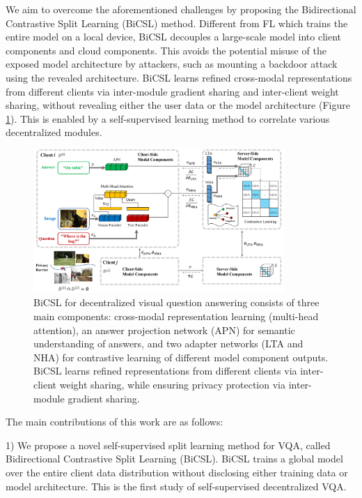 \documentclass[letterpaper]{article} %
\begin{document}
We aim to overcome the aforementioned challenges by proposing the Bidirectional Contrastive Split Learning (BiCSL) method. Different from FL which trains the entire model on a local device, BiCSL decouples a large-scale model into client components and cloud components. This avoids the potential misuse of the exposed model architecture by attackers, such as mounting a backdoor attack using the revealed architecture. BiCSL learns refined cross-modal representations from different clients via inter-module gradient sharing and inter-client weight sharing, without revealing either the user data or the model architecture (Figure \ref{fig:scheme}). This is enabled by a self-supervised learning method to correlate various decentralized modules.


\begin{figure}
    \centering
    \includegraphics[width=0.85\textwidth]{figures/scheme.pdf}
    \caption{BiCSL for decentralized visual question answering consists of three main components: cross-modal representation learning (multi-head attention), an answer projection network (APN) for semantic understanding of answers, and two adapter networks (LTA and NHA) for contrastive learning of different model component outputs. BiCSL learns refined representations from different clients via inter-client weight sharing, while ensuring privacy protection via inter-module gradient sharing.}
    \label{fig:scheme}
\end{figure}

The main contributions of this work are as follows:

1) We propose a novel self-supervised split learning method for VQA, called Bidirectional Contrastive Split Learning (BiCSL). BiCSL trains a global model over the entire client data distribution without disclosing either training data or model architecture. This is the first study of self-supervised decentralized VQA. 
\end{document}
